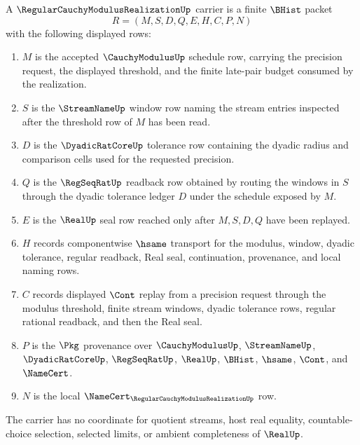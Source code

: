 \begin{definition}
\label{def:regular-cauchy-modulus-realization-carrier}
A $\RegularCauchyModulusRealizationUp$ carrier is a finite $\BHist$ packet
$$
R=(M,S,D,Q,E,H,C,P,N)
$$
with the following displayed rows:
\begin{enumerate}
\item $M$ is the accepted $\CauchyModulusUp$ schedule row, carrying the precision request, the displayed threshold, and the finite late-pair budget consumed by the realization.
\item $S$ is the $\StreamNameUp$ window row naming the stream entries inspected after the threshold row of $M$ has been read.
\item $D$ is the $\DyadicRatCoreUp$ tolerance row containing the dyadic radius and comparison cells used for the requested precision.
\item $Q$ is the $\RegSeqRatUp$ readback row obtained by routing the windows in $S$ through the dyadic tolerance ledger $D$ under the schedule exposed by $M$.
\item $E$ is the $\RealUp$ seal row reached only after $M,S,D,Q$ have been replayed.
\item $H$ records componentwise $\hsame$ transport for the modulus, window, dyadic tolerance, regular readback, Real seal, continuation, provenance, and local naming rows.
\item $C$ records displayed $\Cont$ replay from a precision request through the modulus threshold, finite stream windows, dyadic tolerance rows, regular rational readback, and then the Real seal.
\item $P$ is the $\Pkg$ provenance over $\CauchyModulusUp$, $\StreamNameUp$, $\DyadicRatCoreUp$, $\RegSeqRatUp$, $\RealUp$, $\BHist$, $\hsame$, $\Cont$, and $\NameCert$.
\item $N$ is the local $\NameCert_{\RegularCauchyModulusRealizationUp}$ row.
\end{enumerate}
The carrier has no coordinate for quotient streams, host real equality, countable-choice selection, selected limits, or ambient completeness of $\RealUp$.
\end{definition}


